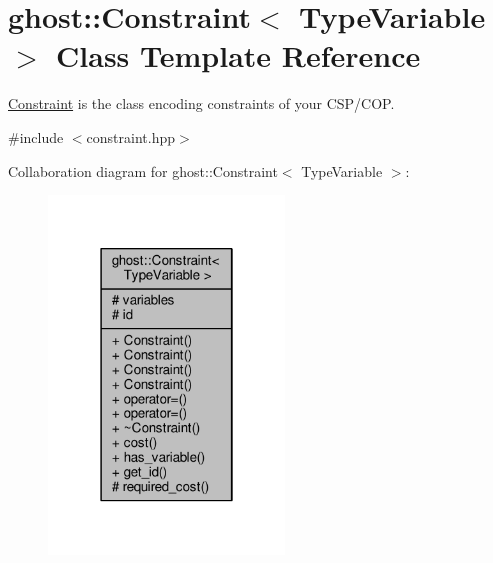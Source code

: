 \hypertarget{classghost_1_1Constraint}{}\section{ghost\+:\+:Constraint$<$ Type\+Variable $>$ Class Template Reference}
\label{classghost_1_1Constraint}


\hyperlink{classghost_1_1Constraint}{Constraint} is the class encoding constraints of your C\+S\+P/\+C\+OP.  




{\ttfamily \#include $<$constraint.\+hpp$>$}



Collaboration diagram for ghost\+:\+:Constraint$<$ Type\+Variable $>$\+:
\nopagebreak
\begin{figure}[H]
\begin{center}
\leavevmode
\includegraphics[width=178pt]{classghost_1_1Constraint__coll__graph}
\end{center}
\end{figure}
